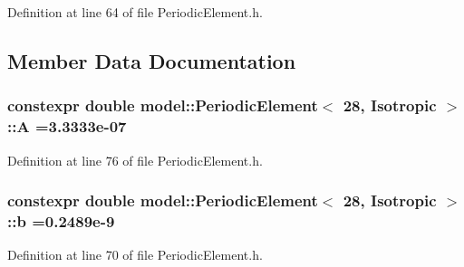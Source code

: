 Definition at line 64 of file Periodic\+Element.\+h.



\subsection{Member Data Documentation}
\hypertarget{structmodel_1_1_periodic_element_3_0128_00_01_isotropic_01_4_a0fdaa3f42d96f8e8058a8cd148d16d56}{}
\subsubsection[{A}]{\setlength{\rightskip}{0pt plus 5cm}constexpr double {\bf model\+::\+Periodic\+Element}$<$ 28, {\bf Isotropic} $>$\+::A =3.\+3333e-\/07\hspace{0.3cm}{\ttfamily [static]}}\label{structmodel_1_1_periodic_element_3_0128_00_01_isotropic_01_4_a0fdaa3f42d96f8e8058a8cd148d16d56}


Definition at line 76 of file Periodic\+Element.\+h.

\hypertarget{structmodel_1_1_periodic_element_3_0128_00_01_isotropic_01_4_a6329c74eb8319fb49ce1e8433127e3b1}{}
\subsubsection[{b}]{\setlength{\rightskip}{0pt plus 5cm}constexpr double {\bf model\+::\+Periodic\+Element}$<$ 28, {\bf Isotropic} $>$\+::b =0.\+2489e-\/9\hspace{0.3cm}{\ttfamily [static]}}\label{structmodel_1_1_periodic_element_3_0128_00_01_isotropic_01_4_a6329c74eb8319fb49ce1e8433127e3b1}


Definition at line 70 of file Periodic\+Element.\+h.

\hypertarget{structmodel_1_1_periodic_element_3_0128_00_01_isotropic_01_4_ab09436c24936ea92ccda9c38d977074a}{}
